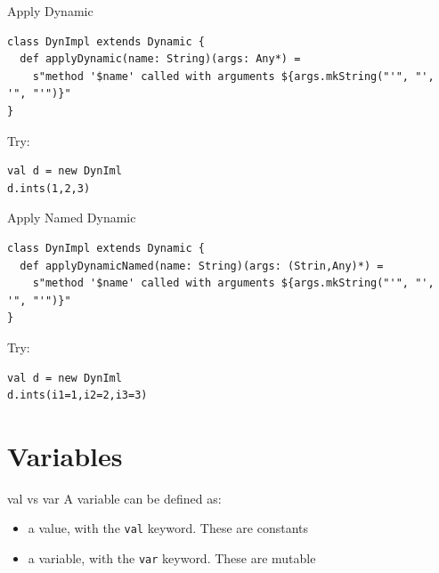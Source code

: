 \documentclass[presentation, aspectratio=169]{beamer}
\begin{document}
\begin{frame}[label={sec:orgd6ddb2f},fragile]{Apply Dynamic}
 \begin{verbatim}
class DynImpl extends Dynamic {
  def applyDynamic(name: String)(args: Any*) =
    s"method '$name' called with arguments ${args.mkString("'", "', '", "'")}"
}
\end{verbatim}
Try:
\begin{verbatim}
val d = new DynIml
d.ints(1,2,3)
\end{verbatim}
\end{frame}

\begin{frame}[label={sec:org3f1e070},fragile]{Apply Named Dynamic}
 \begin{verbatim}
class DynImpl extends Dynamic {
  def applyDynamicNamed(name: String)(args: (Strin,Any)*) =
    s"method '$name' called with arguments ${args.mkString("'", "', '", "'")}"
}
\end{verbatim}
Try:
\begin{verbatim}
val d = new DynIml
d.ints(i1=1,i2=2,i3=3)
\end{verbatim}
\end{frame}



\section{Variables}
\label{sec:orgc857d69}

\begin{frame}[label={sec:orgefca510},fragile]{val vs var}
 A variable can be defined as: 
\begin{itemize}
\item a value, with the \texttt{val} keyword. These are constants
\item a variable,  with the \texttt{var} keyword. These are mutable
\end{itemize}
\end{frame}
\end{document}

